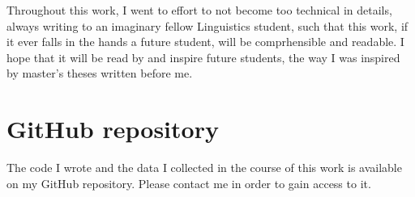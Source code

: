 Throughout this work, I went to effort to not become too technical in details, always writing to an imaginary fellow Linguistics student, such that this work, if it ever falls in the hands a future student, will be comprhensible and readable. 
I hope that it will be read by and inspire future students, the way I was inspired by master's theses written before me.

\section{GitHub repository}
The code I wrote and the data I collected in the course of this work is available on my GitHub repository. 
Please contact me in order to gain access to it.


